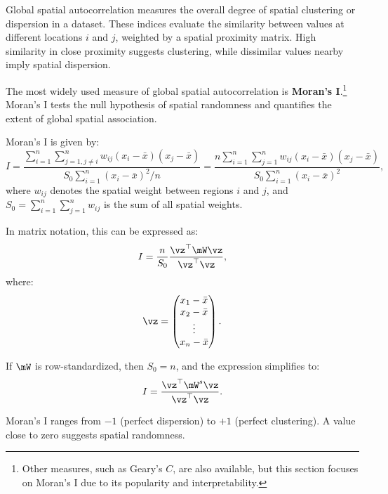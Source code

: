 Global spatial autocorrelation measures the overall degree of spatial clustering or dispersion in a dataset. These indices evaluate the similarity between values at different locations $i$ and $j$, weighted by a spatial proximity matrix. High similarity in close proximity suggests clustering, while dissimilar values nearby imply spatial dispersion.

The most widely used measure of global spatial autocorrelation is \textbf{Moran's I}.\footnote{Other measures, such as Geary's $C$, are also available, but this section focuses on Moran's I due to its popularity and interpretability.} Moran's I tests the null hypothesis of spatial randomness and quantifies the extent of global spatial association.

Moran's I is given by:
\begin{equation}\label{eq:I-moran}
I = \frac{\sum_{i = 1}^n\sum_{j=1, j\neq i}^n w_{ij}\left(x_i - \bar{x}\right)\left(x_j - \bar{x}\right)}{S_0 \sum_{i = 1}^n\left(x_i - \bar{x}\right)^2/n} = \frac{n\sum_{i = 1}^n\sum_{j=1}^n w_{ij}\left(x_i - \bar{x}\right)\left(x_j - \bar{x}\right)}{S_0 \sum_{i = 1}^n\left(x_i - \bar{x}\right)^2},
\end{equation}
%
where $w_{ij}$ denotes the spatial weight between regions $i$ and $j$, and $S_0 = \sum_{i=1}^n\sum_{j=1}^n w_{ij}$ is the sum of all spatial weights.

In matrix notation, this can be expressed as:
\begin{equation*}
	I = \frac{n}{S_0} \frac{\vz^\top\mW\vz}{\vz^\top\vz},
\end{equation*}
%
where: 
\begin{equation*}
\vz = \begin{pmatrix}
          x_1 - \bar{x}\\
          x_2 - \bar{x} \\
          \vdots\\
          x_n - \bar{x}
      \end{pmatrix}.
\end{equation*}

If $\mW$ is row-standardized, then $S_0 = n$, and the expression simplifies to:
\begin{equation*}
I = \frac{\vz^\top \mW^s \vz}{\vz^\top \vz}.
\end{equation*}

Moran’s I ranges from $-1$ (perfect dispersion) to $+1$ (perfect clustering). A value close to zero suggests spatial randomness.


